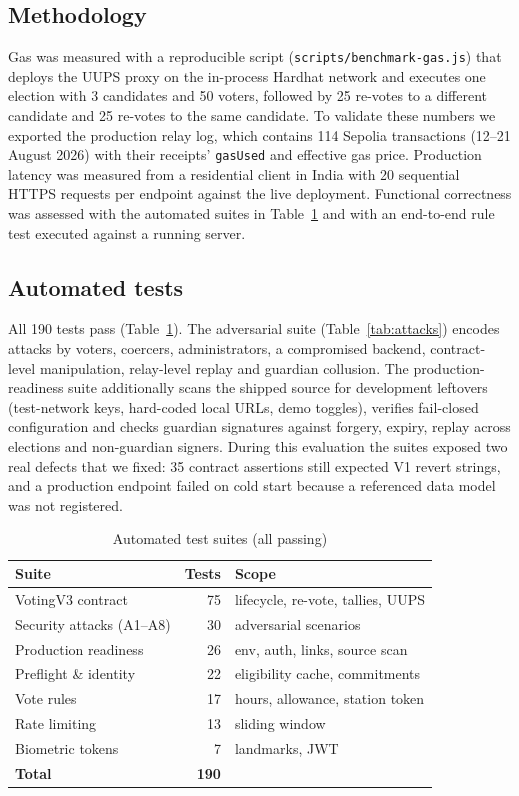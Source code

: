 \documentclass[conference]{IEEEtran}
\newcommand{\code}[1]{\texttt{\small #1}}
\begin{document}
\subsection{Methodology}
Gas was measured with a reproducible script (\code{scripts/benchmark-gas.js}) that deploys the UUPS proxy on the in-process Hardhat network and executes one election with 3 candidates and 50 voters, followed by 25 re-votes to a different candidate and 25 re-votes to the same candidate. To validate these numbers we exported the production relay log, which contains 114 Sepolia transactions (12--21 August 2026) with their receipts' \code{gasUsed} and effective gas price. Production latency was measured from a residential client in India with 20 sequential HTTPS requests per endpoint against the live deployment. Functional correctness was assessed with the automated suites in Table~\ref{tab:tests} and with an end-to-end rule test executed against a running server.

\subsection{Automated tests}
All 190 tests pass (Table~\ref{tab:tests}). The adversarial suite (Table~\ref{tab:attacks}) encodes attacks by voters, coercers, administrators, a compromised backend, contract-level manipulation, relay-level replay and guardian collusion. The production-readiness suite additionally scans the shipped source for development leftovers (test-network keys, hard-coded local URLs, demo toggles), verifies fail-closed configuration and checks guardian signatures against forgery, expiry, replay across elections and non-guardian signers. During this evaluation the suites exposed two real defects that we fixed: 35 contract assertions still expected V1 revert strings, and a production endpoint failed on cold start because a referenced data model was not registered.

\begin{table}[t]
\caption{Automated test suites (all passing)}
\label{tab:tests}
\centering
\footnotesize
\begin{tabular}{@{}lrl@{}}
\toprule
\textbf{Suite} & \textbf{Tests} & \textbf{Scope} \\
\midrule
VotingV3 contract & 75 & lifecycle, re-vote, tallies, UUPS \\
Security attacks (A1--A8) & 30 & adversarial scenarios \\
Production readiness & 26 & env, auth, links, source scan \\
Preflight \& identity & 22 & eligibility cache, commitments \\
Vote rules & 17 & hours, allowance, station token \\
Rate limiting & 13 & sliding window \\
Biometric tokens & 7 & landmarks, JWT \\
\midrule
\textbf{Total} & \textbf{190} & \\
\bottomrule
\end{tabular}
\end{table}
\end{document}

